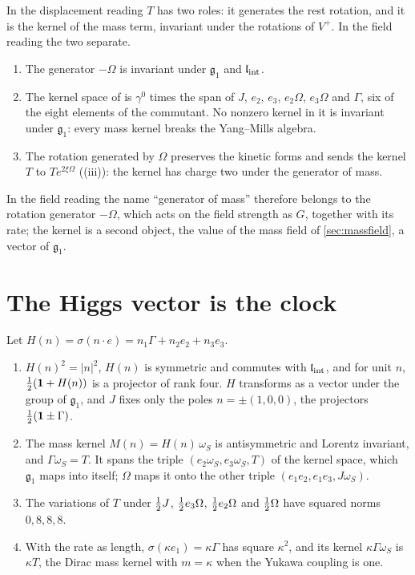 \begin{proposition}
\label{prop:twojobs}
In the displacement reading $T$ has two roles: it generates the rest rotation, and it is the kernel of the mass term, invariant under the
rotations of $V^+$. In the field reading the two separate.
\begin{enumerate}[label=(\roman*),leftmargin=2.2em,itemsep=1pt]
\item The generator $-\Omega$ is invariant under $\mathfrak g_1$ and $\mathfrak l_{\rm int}$.
\item The kernel space of  is $\gamma^0$ times the span of $J$, $e_2$, $e_3$, $e_2\Omega$, $e_3\Omega$ and $\Gamma$, six of the
eight elements of the commutant. No nonzero kernel in it is invariant under $\mathfrak g_1$: every mass kernel breaks the Yang--Mills
algebra.
\item The rotation generated by $\Omega$ preserves the kinetic forms and sends the kernel $T$ to $Te^{2\xi\Omega}$ ((iii)): the
kernel has charge two under the generator of mass.
\end{enumerate}
\end{proposition}

In the field reading the name ``generator of mass'' therefore belongs to the rotation generator $-\Omega$, which acts on the field strength
as $G$, together with its rate; the kernel is a second object, the value of the mass field of \cref{sec:massfield}, a vector of
$\mathfrak g_1$.

\section{The Higgs vector is the clock}

\begin{proposition}
\label{prop:higgs1}
Let $H(n)=\sigma(n\cdot e)=n_1\Gamma+n_2e_2+n_3e_3$.
\begin{enumerate}[label=(\roman*),leftmargin=2.2em,itemsep=1pt]
\item $H(n)^2=|n|^2$, $H(n)$ is symmetric and commutes with $\mathfrak l_{\rm int}$, and for unit $n$, $\tfrac12(\mathbf 1+H(n))$ is a projector of rank four. $H$
transforms as a vector under the group of $\mathfrak g_1$, and $J$ fixes only the poles $n=\pm(1,0,0)$, the projectors
$\tfrac12(\mathbf 1\pm\Gamma)$.
\item The mass kernel $M(n)=H(n)\,\omega_S$ is antisymmetric and Lorentz invariant, and $\Gamma\omega_S=T$. It spans the triple
$(e_2\omega_S,e_3\omega_S,T)$ of the kernel space, which $\mathfrak g_1$ maps into itself; $\Omega$ maps it onto the other triple
$(e_1e_2,e_1e_3,J\omega_S)$.
\item The variations of $T$ under $\tfrac12 J$, $\tfrac12 e_3\Omega$, $\tfrac12 e_2\Omega$ and $\tfrac12\Omega$ have squared norms $0,8,8,8$.
\item With the rate as length, $\sigma(\kappa e_1)=\kappa\Gamma$ has square $\kappa^2$, and its kernel $\kappa\Gamma\omega_S$ is $\kappa T$, the
Dirac mass kernel with $m=\kappa$ when the Yukawa coupling is one.
\end{enumerate}
\end{proposition}

